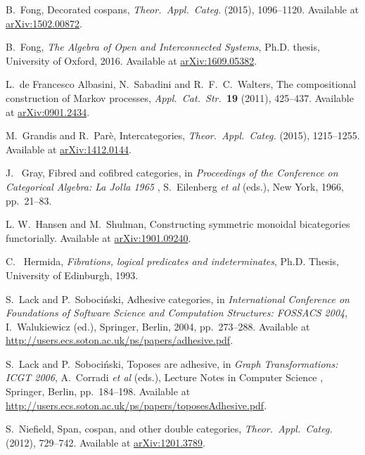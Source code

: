 \documentclass[oneside,final]{ucr}
\theoremstyle{definition}
\newcommand{\define}[1]{{\bf \boldmath #1}}
\begin{document}
{\begin{thebibliography}{1}
 B.\ Fong, Decorated cospans, \textsl{Theor.\ Appl.\ Categ.} 
\define{30} (2015), 1096--1120.   Available at 
\href{http://arxiv.org/abs/1502.00872}{arXiv:1502.00872}.

 B.\ Fong, \textsl{The Algebra of Open and Interconnected Systems}, Ph.D. thesis, University of Oxford, 2016.  Available at \href{https://arxiv.org/abs/1609.05382}{arXiv:1609.05382}.

 L.\ de Francesco Albasini, N.\ Sabadini and R.\ F.\ C.\ Walters, The compositional construction of Markov processes, \textsl{Appl.\ Cat.\ Str.\ }{\bf 19} (2011), 425--437. Available at \href{http://arxiv.org/abs/0901.2434}{arXiv:0901.2434}.

 M.\ Grandis and R.\ Par\`e, Intercategories,  \textsl{Theor.\ Appl.\ Categ.}
\define{30} (2015), 1215--1255. Available at \href{https://arxiv.org/abs/1412.0144}{arXiv:1412.0144}. 

 J. \ Gray, Fibred and cofibred categories, in \textsl{Proceedings of the Conference on Categorical Algebra: La Jolla 1965} , S.\ Eilenberg \textit{et al} (eds.), New York, 1966, pp.\ 21--83.

 L. W.\ Hansen and M.\ Shulman, Constructing symmetric monoidal bicategories functorially. Available at \href{https://arxiv.org/pdf/1910.09240.pdf}{arXiv:1901.09240}.

 C. \ Hermida, \textsl{Fibrations, logical predicates and indeterminates}, Ph.D. Thesis, University of Edinburgh, 1993.

 S.\ Lack and P.\ Soboci\'nski, Adhesive categories, in \textsl{International Conference on Foundations of Software Science and Computation Structures: FOSSACS 2004}, I.\ Walukiewicz (ed.), Springer, Berlin, 2004, pp.\ 273--288.  Available at \href{http://users.ecs.soton.ac.uk/ps/papers/adhesive.pdf}{http://users.ecs.soton.ac.uk/ps/papers/adhesive.pdf}.

 S.\ Lack and P.\ Soboci\'nski, Toposes are adhesive, in
\textsl{Graph Transformations: ICGT 2006}, A.\ Corradi \textit{et al} (eds.), 
Lecture Notes in Computer Science \define{4178}, Springer, Berlin, pp.\ 184--198.
Available at \href{http://users.ecs.soton.ac.uk/ps/papers/toposesAdhesive.pdf}{http://users.ecs.soton.ac.uk/ps/papers/toposesAdhesive.pdf}.

 S.\ Niefield, Span, cospan, and other double categories, \textsl{Theor.\ Appl.\ Categ.}
\define{26} (2012), 729--742.  Available at \href{https://arxiv.org/abs/1201.3789}{arXiv:1201.3789}.


\end{thebibliography}}
\end{document}
